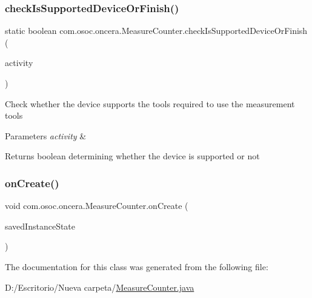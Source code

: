 \subsubsection{\texorpdfstring{checkIsSupportedDeviceOrFinish()}{checkIsSupportedDeviceOrFinish()}}
{\footnotesize\ttfamily static boolean com.\+osoc.\+oncera.\+Measure\+Counter.\+check\+Is\+Supported\+Device\+Or\+Finish (\begin{DoxyParamCaption}\item[{final Activity}]{activity }\end{DoxyParamCaption})\hspace{0.3cm}{\ttfamily [static]}}

Check whether the device supports the tools required to use the measurement tools 
\begin{DoxyParams}{Parameters}
{\em activity} & \\
\hline
\end{DoxyParams}
\begin{DoxyReturn}{Returns}
boolean determining whether the device is supported or not 
\end{DoxyReturn}
\mbox{\label{classcom_1_1osoc_1_1oncera_1_1_measure_counter_a4c5ab3247870cd93695e6ca99c1c2a19}} 
\subsubsection{\texorpdfstring{onCreate()}{onCreate()}}
{\footnotesize\ttfamily void com.\+osoc.\+oncera.\+Measure\+Counter.\+on\+Create (\begin{DoxyParamCaption}\item[{Bundle}]{saved\+Instance\+State }\end{DoxyParamCaption})\hspace{0.3cm}{\ttfamily [protected]}}



The documentation for this class was generated from the following file\+:\begin{DoxyCompactItemize}
\item 
D\+:/\+Escritorio/\+Nueva carpeta/\mbox{\hyperlink{_measure_counter_8java}{Measure\+Counter.\+java}}\end{DoxyCompactItemize}
